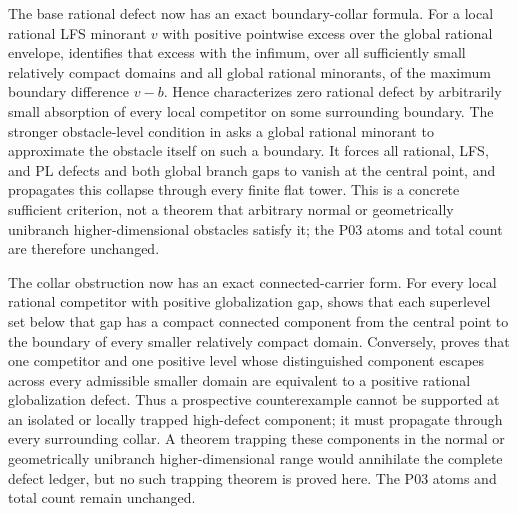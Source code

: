 The base rational defect now has an exact boundary-collar formula.
For a local rational LFS minorant \(v\) with positive pointwise excess over
the global rational envelope,
 identifies that excess with the
infimum, over all sufficiently small relatively compact domains and all
global rational minorants, of the maximum boundary difference \(v-b\).
Hence  characterizes zero rational
defect by arbitrarily small absorption of every local competitor on some
surrounding boundary.  The stronger obstacle-level condition in
 asks a global rational minorant
to approximate the obstacle itself on such a boundary.  It forces all
rational, LFS, and PL defects and both global branch gaps to vanish at the
central point, and
 propagates this
collapse through every finite flat tower.  This is a concrete sufficient
criterion, not a theorem that arbitrary normal or geometrically unibranch
higher-dimensional obstacles satisfy it; the P03 atoms and total count are
therefore unchanged.

The collar obstruction now has an exact connected-carrier form.
For every local rational competitor with positive globalization gap,
 shows that each superlevel set below
that gap has a compact connected component from the central point to the
boundary of every smaller relatively compact domain.  Conversely,
 proves that one
competitor and one positive level whose distinguished component escapes
across every admissible smaller domain are equivalent to a positive rational
globalization defect.  Thus a prospective counterexample
cannot be supported at an isolated or locally trapped high-defect component;
it must propagate through every surrounding collar.  A theorem trapping
these components in the normal or geometrically unibranch
higher-dimensional range would annihilate the complete defect ledger, but no
such trapping theorem is proved here.  The P03 atoms and total count remain
unchanged.

